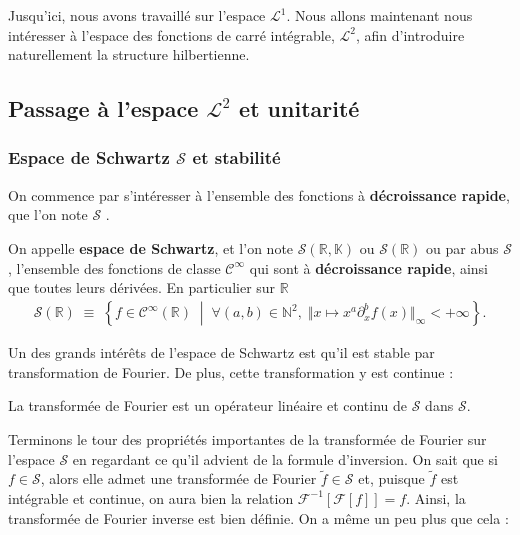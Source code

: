 


\bigskip

Jusqu'ici, nous avons travaillé sur l'espace $\mathcal L^1$. Nous allons maintenant nous intéresser à l'espace des fonctions de carré intégrable, $\mathcal L^2$, afin d'introduire naturellement la structure hilbertienne.

\subsection{Passage à l'espace $\mathcal L^2$ et unitarité}

\subsubsection{Espace de Schwartz $\mathcal S$ et stabilité}

On commence par s'intéresser à l'ensemble des fonctions à {\bf décroissance rapide}, que l'on note $\mathcal S$ \cite{AppelMathPhysiciens, AymanMoussatempérees}.

\begin{Defi} 
On appelle {\bf espace de Schwartz}, et l'on note $\mathcal S(\mathbb R , \mathbb K)$ ou $\mathcal S(\mathbb R)$ ou par abus $\mathcal S$, l'ensemble des fonctions de classe $\mathcal C^\infty$ qui sont à {\bf décroissance rapide}, ainsi que toutes leurs dérivées. En particulier sur $\mathbb R$
\begin{eqnarray}
    \mathcal S(\mathbb R) \; \equiv \; 
    \left\{ f \in \mathcal C^\infty (\mathbb R) \;\middle\vert\; 
    \forall (a,b)\in \mathbb N^2, \; 
    \Vert x \mapsto x^a \partial_x^b f(x) \Vert_\infty < +\infty \right\}.
\end{eqnarray}
\end{Defi}

Un des grands intérêts de l'espace de Schwartz est qu'il est stable par transformation de Fourier. De plus, cette transformation y est continue :

\begin{Theo} La transformée de Fourier est un opérateur linéaire et continu de $\mathcal S$ dans $\mathcal S$.
\end{Theo} 

Terminons le tour des propriétés importantes de la transformée de Fourier sur l'espace $\mathcal S$ en regardant ce qu'il advient de la formule d'inversion. On sait que si $f\in \mathcal S$, alors elle admet une transformée de Fourier $\tilde f \in \mathcal S$ et, puisque $\tilde f$ est intégrable et continue, on aura bien la relation $\mathcal F^{-1} [ \mathcal F [f]] = f$. Ainsi, la transformée de Fourier inverse est bien définie. On a même un peu plus que cela :

